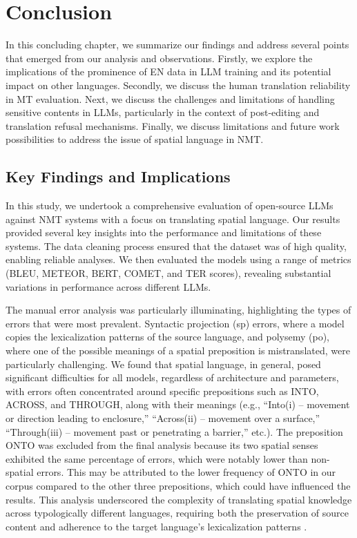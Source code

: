 \chapter{Conclusion}
\label{cap:Conclusao}

In this concluding chapter, we summarize our findings and address several points that emerged from our analysis and observations. Firstly, we explore the implications of the prominence of EN data in LLM training and its potential impact on other languages. Secondly, we discuss the human translation reliability in MT evaluation. Next, we discuss the challenges and limitations of handling sensitive contents in LLMs, particularly in the context of post-editing and translation refusal mechanisms. Finally, we discuss limitations and future work possibilities to address the issue of spatial language in NMT.


\section{Key Findings and Implications}

In this study, we undertook a comprehensive evaluation of open-source LLMs against NMT systems with a focus on translating spatial language. Our results provided several key insights into the performance and limitations of these systems. The data cleaning process ensured that the dataset was of high quality, enabling reliable analyses. We then evaluated the models using a range of metrics (BLEU, METEOR, BERT, COMET, and TER scores), revealing substantial variations in performance across different LLMs.

The manual error analysis was particularly illuminating, highlighting the types of errors that were most prevalent. Syntactic projection (sp) errors, where a model copies the lexicalization patterns of the source language, and polysemy (po), where one of the possible meanings of a spatial preposition is mistranslated, were particularly challenging. We found that spatial language, in general, posed significant difficulties for all models, regardless of architecture and parameters, with errors often concentrated around specific prepositions such as INTO, ACROSS, and THROUGH, along with their meanings (e.g., ``Into(i) -- movement or direction leading to enclosure,'' ``Across(ii) -- movement over a surface,'' ``Through(iii) -- movement past or penetrating a barrier,'' etc.). The preposition ONTO was excluded from the final analysis because its two spatial senses exhibited the same percentage of errors, which were notably lower than non-spatial errors. This may be attributed to the lower frequency of ONTO in our corpus compared to the other three prepositions, which could have influenced the results. This analysis underscored the complexity of translating spatial knowledge across typologically different languages, requiring both the preservation of source content and adherence to the target language's lexicalization patterns \parencite{house2018,talmy2000toward, talmy2000towardb, slobin2005relating}.

